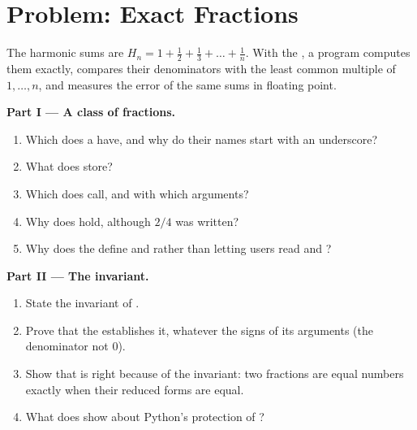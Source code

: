 \section{Problem: Exact Fractions}\label{sec:g12:classes-and-objects:problem}

\begin{problem}\label{pb:g12:classes-and-objects:1}
The harmonic sums are $H_n = 1 + \frac12 + \frac13 + \dots + \frac1n$. With the  , a program
computes them exactly, compares their denominators with the least common multiple of $1, \dots, n$, and measures the
error of the same sums in floating point.

\label{lst:g12:classes-and-objects:harmonic}

\label{out:g12:classes-and-objects:harmonic}

\medskip\noindent\textbf{Part I --- A class of fractions.}
\begin{enumerate}
  \item Which  does a  have, and why do their names start with an underscore?
  \item What does  store?
  \item Which  does  call, and with which arguments?
  \item Why does  hold, although $2/4$ was written?
  \item Why does the  define  and  rather than letting users read
     and ?
\end{enumerate}

\medskip\noindent\textbf{Part II --- The invariant.}
\begin{enumerate}[resume]
  \item State the invariant of .
  \item Prove that the  establishes it, whatever the signs of its arguments (the denominator not $0$).
  \item Show that  is right because of the invariant: two fractions are equal numbers exactly when their
    reduced forms are equal.
  \item What does  show about Python's protection of ?
\end{enumerate}


\end{problem}
